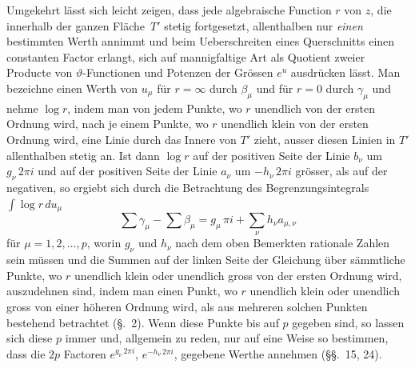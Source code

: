 \documentclass[a4paper,12pt,leqno]{article}
\begin{document}
Umgekehrt l\"{a}sst sich leicht zeigen, dass jede algebraische
Function $r$ von $z$, die innerhalb der ganzen Fl\"{a}che~$T'$
stetig fortgesetzt, allenthalben nur \emph{einen} bestimmten
Werth annimmt und beim Ueberschreiten eines Querschnitts einen
constanten Factor erlangt, sich auf mannigfaltige Art als
Quotient zweier Producte von $\vartheta$-Functionen und Potenzen
der Gr\"{o}ssen $e^u$ ausdr\"{u}cken l\"{a}sst.  Man bezeichne
einen Werth von $u_\mu$ f\"{u}r $r = \infty$ durch $\beta_\mu$
und f\"{u}r $r = 0$ durch $\gamma_\mu$ und nehme $\log r$, indem
man von jedem Punkte, wo $r$ unendlich von der ersten Ordnung
wird, nach je einem Punkte, wo $r$ unendlich klein von der ersten
Ordnung wird, eine Linie durch das Innere von $T'$ zieht, ausser
diesen Linien in $T'$ allenthalben stetig an.  Ist dann $\log r$
auf der positiven Seite der Linie $b_\nu$ um $g_\nu \, 2\pi i$
und auf der positiven Seite der Linie $a_\nu$ um
$- h_\nu \, 2\pi i$ gr\"{o}sser, als auf der negativen, so
ergiebt sich durch die Betrachtung des Begrenzungsintegrals
$\int \log r \, du_\mu$
\[ \sum \gamma_\mu - \sum \beta_\mu
   = g_\mu \, \pi i + \sum_\nu h_\nu a_{\mu, \nu} \]
f\"{u}r $\mu = 1,2,\ldots, p$, worin $g_\nu$ und $h_\nu$ nach dem
oben Bemerkten rationale Zahlen sein m\"{u}ssen und die Summen
auf der linken Seite der Gleichung \"{u}ber s\"{a}mmtliche
Punkte, wo $r$ unendlich klein oder unendlich gross von der
ersten Ordnung wird, auszudehnen sind, indem man einen Punkt, wo
$r$ unendlich klein oder unendlich gross von einer h\"{o}heren
Ordnung wird, als aus mehreren solchen Punkten bestehend
betrachtet (\S.~2).  Wenn diese Punkte bis auf $p$ gegeben sind,
so lassen sich diese $p$ immer und, allgemein zu reden, nur auf
eine Weise so bestimmen, dass die $2p$ Factoren
$e^{g_\nu \, 2 \pi i}$, $e^{- h_\nu \, 2 \pi i}$,
gegebene Werthe annehmen (\S\S.~15, 24).
\end{document}
